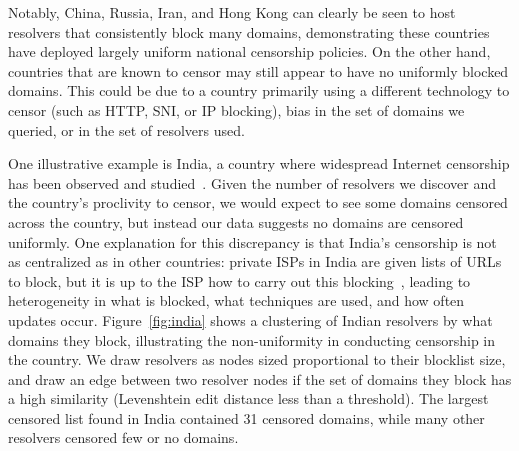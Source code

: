 Notably, China, Russia, Iran, and Hong Kong can clearly be seen to host
resolvers that consistently block many domains, demonstrating these countries have
deployed largely uniform national censorship policies. On the other hand,
countries that are known to censor may still appear to have no uniformly blocked
domains. This could be due to a country primarily using a different technology
to censor (such as HTTP, SNI, or IP blocking), bias in the set of domains we
queried, or in the set of resolvers used.

One illustrative example is India, a country where widespread Internet censorship has
been observed and studied~\cite{singh2020india,Yadav2018a}. Given the number
of resolvers we discover and the country's proclivity to censor, we would expect to see
some domains censored across the country, but instead our data suggests no
domains are censored uniformly. One explanation for this discrepancy is that
India's censorship is not as centralized as in other countries: private ISPs in
India are given lists of URLs to block, but it is up to the ISP how to carry out
this blocking~\cite{Gosain2017a}, leading to heterogeneity in what is blocked,
what techniques are used, and how often updates occur.  Figure~\ref{fig:india}
shows a clustering of Indian resolvers by what domains they block, illustrating the non-uniformity in
conducting censorship in the country. We draw resolvers as nodes sized proportional
to their blocklist size, and draw an edge between two resolver
nodes if the set of domains they block has a high similarity (Levenshtein edit
distance less than a threshold). The largest censored list found in India contained 31
censored domains, while many other resolvers censored few or no domains.


\FigIndiaCluster
\fi


